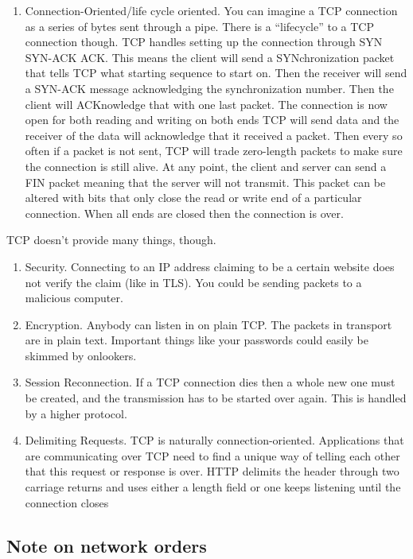 \begin{enumerate}
\item Connection-Oriented/life cycle oriented.
  You can imagine a TCP connection as a series of bytes sent through a pipe.
  There is a ``lifecycle'' to a TCP connection though.
  TCP handles setting up the connection through SYN SYN-ACK ACK. This means the client will send a SYNchronization packet that tells TCP what starting sequence to start on. Then the receiver will send a SYN-ACK message acknowledging the synchronization number.
  Then the client will ACKnowledge that with one last packet.
  The connection is now open for both reading and writing on both ends
  TCP will send data and the receiver of the data will acknowledge that it received a packet.
  Then every so often if a packet is not sent, TCP will trade zero-length packets to make sure the connection is still alive.
  At any point, the client and server can send a FIN packet meaning that the server will not transmit.
  This packet can be altered with bits that only close the read or write end of a particular connection. When all ends are closed then the connection is over.
\end{enumerate}

TCP doesn't provide many things, though.

\begin{enumerate}
\item Security.
  Connecting to an IP address claiming to be a certain website does not verify the claim (like in TLS).
  You could be sending packets to a malicious computer.
\item Encryption.
  Anybody can listen in on plain TCP.
  The packets in transport are in plain text.
  Important things like your passwords could easily be skimmed by onlookers.
\item Session Reconnection. If a TCP connection dies then a whole new one must be created, and the transmission has to be started over again.
  This is handled by a higher protocol.
\item Delimiting Requests.
  TCP is naturally connection-oriented.
  Applications that are communicating over TCP need to find a unique way of telling each other that this request or response is over.
  HTTP delimits the header through two carriage returns and uses either a length field or one keeps listening until the connection closes
\end{enumerate}

\subsection{Note on network orders}

